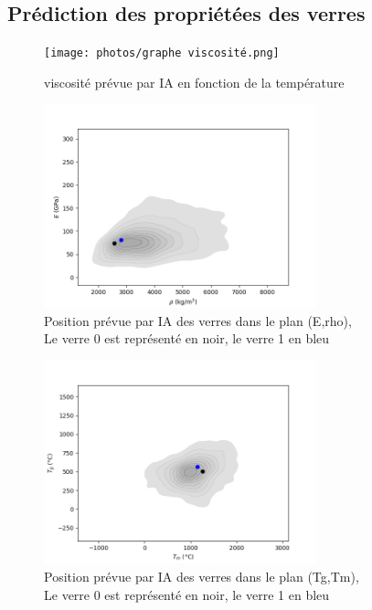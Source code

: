 \documentclass{article}
\begin{document}
\subsection{Prédiction des propriétées des verres}
\begin{figure}[h]
    \centering
    \texttt{[image: photos/graphe viscosité.png]}
    \caption{viscosité prévue par IA en fonction de la température}
\end{figure}
\begin{figure}[h]
    \centering
    \includegraphics[width=0.7\textwidth]{photos/E rho.png}
    \caption{Position prévue par IA des verres dans le plan (E,rho),\\ Le verre 0 est représenté en noir, le verre 1 en bleu}
\end{figure}
\begin{figure}[h]
    \centering
    \includegraphics[width=0.7\textwidth]{photos/Tg Tm.png}
    \caption{Position prévue par IA des verres dans le plan (Tg,Tm),\\ Le verre 0 est représenté en noir, le verre 1 en bleu}
\end{figure}
\end{document}
